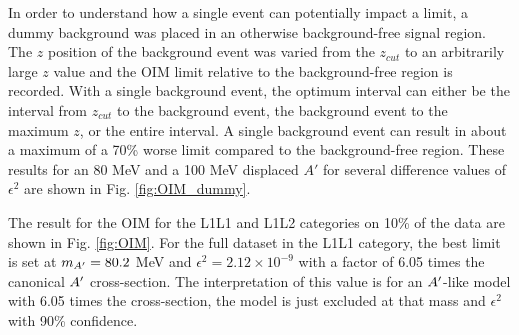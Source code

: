 In order to understand how a single event can potentially impact a limit, a dummy background was placed in an otherwise background-free signal region. The $z$ position of the background event was varied from the $z_{cut}$ to an arbitrarily large $z$ value and the OIM limit relative to the background-free region is recorded. With a single background event, the optimum interval can either be the interval from $z_{cut}$ to the background event, the background event to the maximum $z$, or the entire interval. A single background event can result in about a maximum of a 70\% worse limit compared to the background-free region. These results for an 80 MeV and a 100 MeV displaced $A'$ for several difference values of $\epsilon^2$ are shown in Fig. \ref{fig:OIM_dummy}.


The result for the OIM for the L1L1 and L1L2 categories on 10\% of the data are shown in Fig. \ref{fig:OIM}. For the full dataset in the L1L1 category, the best limit is set at $m_{A^\prime}=80.2$ MeV and $\epsilon^2=2.12 \times 10^{-9}$ with a factor of 6.05 times the canonical $A^\prime$ cross-section. The interpretation of this value is for an $A^\prime$-like model with 6.05 times the cross-section, the model is just excluded at that mass and $\epsilon^2$ with 90\% confidence.

